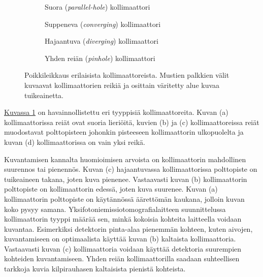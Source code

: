 \begin{figure}[H]
    \centering
    \captionsetup{width=.9\textwidth}
    \begin{subfigure}[t]{.4\textwidth}
        \resizebox{\linewidth}{!}{}
        \caption{Suora (\textit{parallel-hole}) kollimaattori}
    \end{subfigure}%
    \hspace{.1\textwidth}%
    \begin{subfigure}[t]{.4\textwidth}
        \resizebox{\linewidth}{!}{}
        \caption{Suppeneva (\textit{converging}) kollimaattori}
    \end{subfigure}
    \begin{subfigure}[b]{.4\textwidth}
        \resizebox{\linewidth}{!}{}
        \caption{Hajaantuva (\textit{diverging}) kollimaattori}
    \end{subfigure}%
    \hspace{.1\textwidth}%
    \begin{subfigure}[b]{.4\textwidth}
        \resizebox{\linewidth}{!}{}
        \caption{Yhden reiän (\textit{pinhole}) kollimaattori}
    \end{subfigure}
    \caption{Poikkileikkaus erilaisista kollimaattoreista. Mustien palkkien välit kuvaavat kollimaattorien reikiä ja osittain väritetty alue kuvaa tuikeainetta.}
    \label{fig:kollimaattorit}
\end{figure}

\hyperref[fig:kollimaattorit]{Kuvassa \ref*{fig:kollimaattorit}} on havainnollistettu eri tyyppisiä kollimaattoreita. Kuvan (a) kollimaattorissa reiät ovat suoria lieriöitä, kuvien (b) ja (c) kollimaattoreissa reiät muodostavat polttopisteen johonkin pisteeseen kollimaattorin ulkopuolelta ja kuvan (d) kollimaattorissa on vain yksi reikä.

Kuvantamisen kannalta huomioimisen arvoista on kollimaattorin mahdollinen suurennos tai pienennös. Kuvan (c) hajaantuvassa kollimaattorissa polttopiste on tuikeaineen takana, joten kuva pienenee. Vastaavasti kuvan (b) kollimaattorin polttopiste on kollimaattorin edessä, joten kuva suurenee. Kuvan (a) kollimaattorin polttopiste on käytännössä äärettömän kaukana, jolloin kuvan koko pysyy samana.\cite{cherry_gamma_2012, van_audenhaege_review_2015} Yksifotoniemissiotomografialaitteen suunnittelussa kollimaattorin tyyppi määrää sen, minkä kokoisia kohteita laitteella voidaan kuvantaa. Esimerkiksi detektorin pinta-alaa pienemmän kohteen, kuten aivojen, kuvantamiseen on optimaalista käyttää kuvan (b) kaltaista kollimaattoria. Vastaavasti kuvan (c) kollimaattoria voidaan käyttää detektoria suurempien kohteiden kuvantamiseen. Yhden reiän kollimaattorilla saadaan suhteellisen tarkkoja kuvia kilpirauhasen kaltaisista pienistä kohteista.\cite{van_audenhaege_review_2015, cherry_single_2012}

